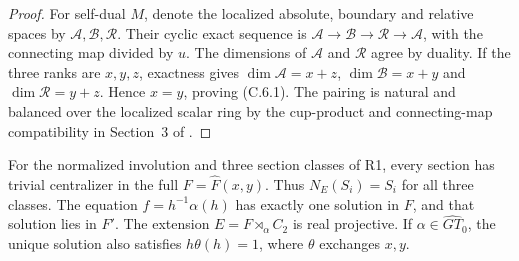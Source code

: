 \begin{proof}
For self-dual $M$, denote the localized absolute,
boundary and relative spaces by $\mathcal A,
\mathcal B,\mathcal R$.  Their cyclic exact sequence
is $\mathcal A\to\mathcal B\to\mathcal R\to\mathcal A$,
with the connecting map divided by $u$.  The dimensions
of $\mathcal A$ and $\mathcal R$ agree by duality.
If the three ranks are $x,y,z$, exactness gives
$\dim\mathcal A=x+z$, $\dim\mathcal B=x+y$ and
$\dim\mathcal R=y+z$.  Hence $x=y$, proving (C.6.1).
The pairing is natural and balanced over the localized
scalar ring by the cup-product and connecting-map
compatibility in Section~3 of \cite{CEWilkes2019}.
\end{proof}

For the normalized involution and three section classes
of R1, every section has trivial centralizer in the full
$F=\widehat F(x,y)$.  Thus $N_E(S_i)=S_i$ for all
three classes.  The equation $f=h^{-1}\alpha(h)$ has
exactly one solution in $F$, and that solution lies in
$F'$.  The extension $E=F\rtimes_\alpha C_2$ is real
projective.  If $\alpha\in\widehat{GT}_0$, the unique
solution also satisfies $h\theta(h)=1$, where $\theta$
exchanges $x,y$.

